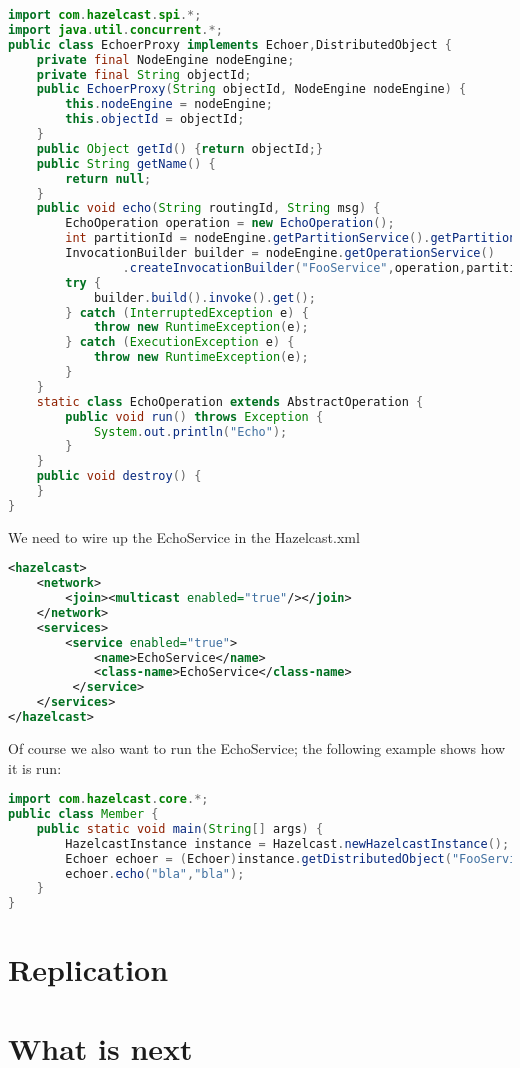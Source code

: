 \begin{lstlisting}[language=java]
import com.hazelcast.spi.*;
import java.util.concurrent.*;
public class EchoerProxy implements Echoer,DistributedObject {
    private final NodeEngine nodeEngine;
    private final String objectId;
    public EchoerProxy(String objectId, NodeEngine nodeEngine) {
        this.nodeEngine = nodeEngine;
        this.objectId = objectId;
    }
    public Object getId() {return objectId;}
    public String getName() {
        return null;
    }
    public void echo(String routingId, String msg) {
        EchoOperation operation = new EchoOperation();
        int partitionId = nodeEngine.getPartitionService().getPartitionId(routingId);
        InvocationBuilder builder = nodeEngine.getOperationService()
                .createInvocationBuilder("FooService",operation,partitionId);
        try {
            builder.build().invoke().get();
        } catch (InterruptedException e) {
            throw new RuntimeException(e);
        } catch (ExecutionException e) {
            throw new RuntimeException(e);
        }
    }
    static class EchoOperation extends AbstractOperation {
        public void run() throws Exception {
            System.out.println("Echo");
        }
    }
    public void destroy() {
    }
}
\end{lstlisting}


We need to wire up the EchoService in the Hazelcast.xml
\begin{lstlisting}[language=xml]
<hazelcast>
    <network>
        <join><multicast enabled="true"/></join>
    </network>
    <services>
        <service enabled="true">
            <name>EchoService</name>
            <class-name>EchoService</class-name>
         </service>
    </services>
</hazelcast>
\end{lstlisting}

Of course we also want to run the EchoService; the following example shows how it is run:
\begin{lstlisting}[language=java]
import com.hazelcast.core.*;
public class Member {
    public static void main(String[] args) {
        HazelcastInstance instance = Hazelcast.newHazelcastInstance();
        Echoer echoer = (Echoer)instance.getDistributedObject("FooService","bla");
        echoer.echo("bla","bla");
    }
}
\end{lstlisting}

\section{Replication}

\section{What is next}
